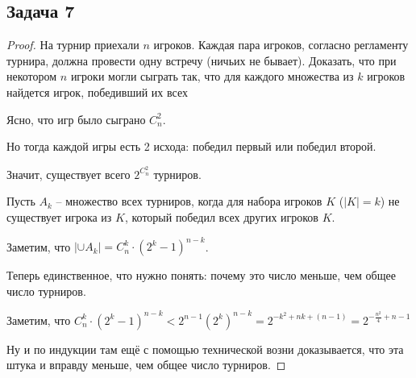 \subsection{Задача 7}

\begin{proof}
На турнир приехали $n$ игроков. Каждая пара игроков, согласно регламенту турнира,
должна провести одну встречу (ничьих не бывает). Доказать, что при некотором $n$
игроки могли сыграть так, что для каждого множества из $k$ игроков найдется игрок,
победивший их всех

Ясно, что игр было сыграно $C^2_n$.

Но тогда каждой игры есть 2 исхода: победил первый или победил второй.

Значит, существует всего $\displaystyle 2^{C^2_n}$ турниров.

Пусть $A_k$ -- множество всех турниров, когда для  набора игроков $K$ ($|K| = k$) не существует игрока из $K$, который победил всех других игроков $K$.

Заметим, что $|\cup A_k| = C^k_n \cdot (2^k - 1)^{n - k}$.

Теперь единственное, что нужно понять: почему это число меньше, чем общее число турниров.

Заметим, что $C^k_n \cdot (2^k - 1)^{n - k} < 2^{n-1} (2^k)^{n-k} = 2^{-k^2 + nk + (n - 1)} = 2^{-\frac{n^2}{4} + n - 1}$

Ну и по индукции там ещё с помощью технической возни доказывается, что эта штука и вправду меньше, чем общее число турниров.
\end{proof}
